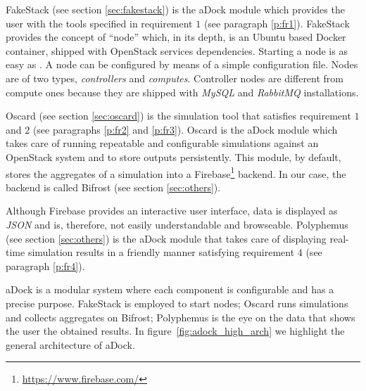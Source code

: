 FakeStack (see section \ref{sec:fakestack}) is the aDock module which provides the user with the tools specified in requirement $1$ (see paragraph \ref{p:fr1}). FakeStack provides the concept of ``node'' which, in its depth, is an Ubuntu based Docker container, shipped with OpenStack services dependencies. Starting a node is as easy as . A node can be configured by means of a simple configuration file. Nodes are of two types, \textit{controllers} and \textit{computes}. Controller nodes are different from compute ones because they are shipped with \textit{MySQL} and \textit{RabbitMQ} installations.

Oscard (see section \ref{sec:oscard}) is the simulation tool that satisfies requirement $1$ and $2$ (see paragraphs \ref{p:fr2} and \ref{p:fr3}). Oscard is the aDock module which takes care of running repeatable and configurable simulations against an OpenStack system and to store outputs persistently. This module, by default, stores the aggregates of a simulation into a Firebase\footnote{\url{https://www.firebase.com/}} backend. In our case, the backend is called Bifrost (see section \ref{sec:others}).

Although Firebase provides an interactive user interface, data is displayed as \textit{JSON} and is, therefore, not easily understandable and browseable. Polyphemus (see section \ref{sec:others}) is the aDock module that takes care of displaying real-time simulation results in a friendly manner satisfying requirement $4$ (see paragraph \ref{p:fr4}).

aDock is a modular system where each component is configurable and has a precise purpose. FakeStack is employed to start nodes; Oscard runs simulations and collects aggregates on Bifrost; Polyphemus is the eye on the data that shows the user the obtained results.
In figure~\ref{fig:adock_high_arch} we highlight the general architecture of aDock.

